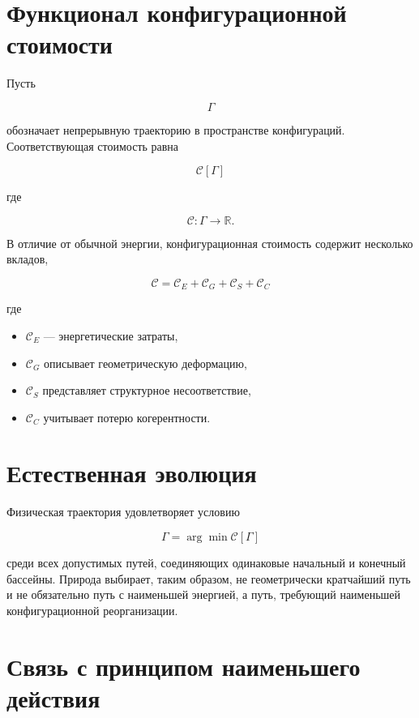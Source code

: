 \section{Функционал конфигурационной стоимости}

Пусть

\[ \Gamma \]

обозначает непрерывную траекторию в пространстве конфигураций. Соответствующая стоимость равна

\[ \boxed{ \mathcal C[\Gamma] } \]

где

\[ \mathcal C : \Gamma \rightarrow \mathbb R. \]

В отличие от обычной энергии, конфигурационная стоимость содержит несколько вкладов,

\[ \boxed{ \mathcal C = \mathcal C_E + \mathcal C_G + \mathcal C_S + \mathcal C_C } \]

где

\begin{itemize}

\item
$\mathcal C_E$
— энергетические затраты,

\item
$\mathcal C_G$
описывает геометрическую деформацию,

\item
$\mathcal C_S$
представляет структурное несоответствие,

\item
$\mathcal C_C$
учитывает потерю когерентности.

\end{itemize}

\section{Естественная эволюция}

Физическая траектория удовлетворяет условию

\[ \boxed{ \Gamma = \arg\min \mathcal C[\Gamma] } \]

среди всех допустимых путей, соединяющих одинаковые начальный и конечный бассейны. Природа выбирает, таким образом, не геометрически кратчайший путь и не обязательно путь с наименьшей энергией, а путь, требующий наименьшей конфигурационной реорганизации.

\section{Связь с принципом наименьшего действия}

